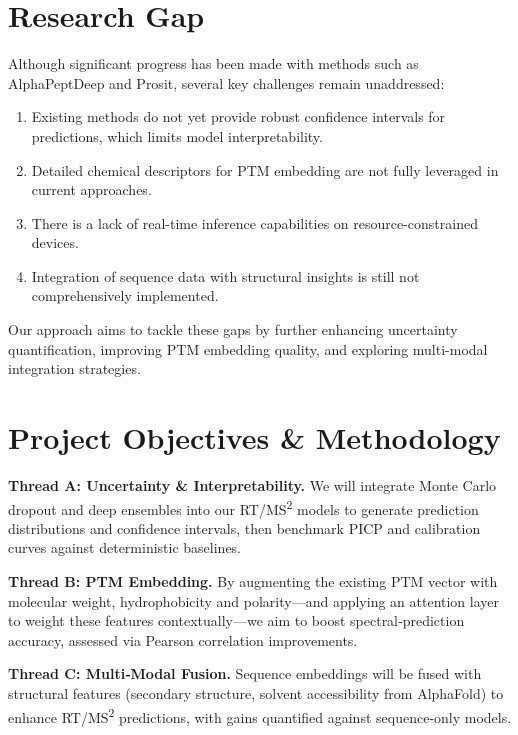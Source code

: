 \documentclass[10pt]{article}
\begin{document}
\section*{Research Gap}
Although significant progress has been made with methods such as AlphaPeptDeep and Prosit, several key challenges remain unaddressed:
\begin{enumerate}[noitemsep]
    \item Existing methods do not yet provide robust confidence intervals for predictions, which limits model interpretability.
    \item Detailed chemical descriptors for PTM embedding are not fully leveraged in current approaches.
    \item There is a lack of real-time inference capabilities on resource-constrained devices.
    \item Integration of sequence data with structural insights is still not comprehensively implemented.
\end{enumerate}
Our approach aims to tackle these gaps by further enhancing uncertainty quantification, improving PTM embedding quality, and exploring multi-modal integration strategies.



\section*{Project Objectives \& Methodology}

\noindent\textbf{Thread A: Uncertainty \& Interpretability.} We will integrate Monte Carlo dropout and deep ensembles into our RT/MS\textsuperscript{2} models to generate prediction distributions and confidence intervals, then benchmark PICP and calibration curves against deterministic baselines.

\medskip
\noindent\textbf{Thread B: PTM Embedding.} By augmenting the existing PTM vector with molecular weight, hydrophobicity and polarity—and applying an attention layer to weight these features contextually—we aim to boost spectral‐prediction accuracy, assessed via Pearson correlation improvements.

\medskip
\noindent\textbf{Thread C: Multi‑Modal Fusion.} Sequence embeddings will be fused with structural features (secondary structure, solvent accessibility from AlphaFold) to enhance RT/MS\textsuperscript{2} predictions, with gains quantified against sequence‐only models.
\end{document}
